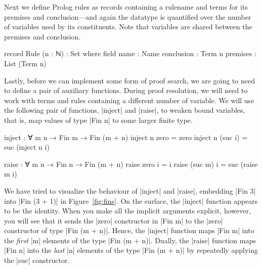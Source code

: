 \documentclass[preprint]{sigplanconf}
\begin{document}
Next we define Prolog rules as records containing a rulename and terms for its
premises and conclusion---and again the datatype is quantified over the number of
variables used by its constituents. Note that variables are shared between the
premises and conclusion. 

\begin{code}
  record Rule (n : ℕ) : Set where
    field
      name        : Name
      conclusion  : Term n
      premises    : List (Term n)
\end{code}


Lastly, before we can implement some form of proof search, we are
going to need to define a pair of auxiliary functions. During proof
resolution, we will need to work with terms and rules containing a
different number of variable. We will use the following pair of
functions, |inject| and |raise|, to weaken bound variables, that is,
map values of type |Fin n| to some larger finite type.
\begin{code}
  inject : ∀ {m} n → Fin m → Fin (m + n)
  inject n  zero    = zero
  inject n (suc i)  = suc (inject n i)

  raise : ∀ m {n} → Fin n → Fin (m + n)
  raise  zero   i  = i
  raise (suc m) i  = suc (raise m i)
\end{code}
We have tried to visualize the behaviour of |inject| and |raise|,
embedding |Fin 3| into |Fin (3 + 1)| in Figure~\ref{fig:fins}. On the
surface, the |inject| function appears to be the identity. When you
make all the implicit arguments explicit, however, you will see that
it sends the |zero| constructor in |Fin m| to the |zero| constructor
of type |Fin (m + n)|. Hence, the |inject| function maps |Fin m| into the
\emph{first} |m| elements of the type |Fin (m + n)|. Dually, the
|raise| function maps |Fin n| into the \emph{last} |n| elements of the
type |Fin (m + n)| by repeatedly applying the |suc| constructor.
\end{document}
